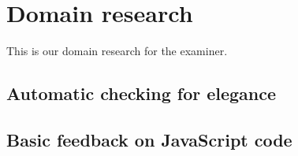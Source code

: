 
\part{Domain research}
This is our domain research for the \gls{examiner}.


\chapter{Automatic checking for elegance}


\chapter{Basic feedback on JavaScript code}


